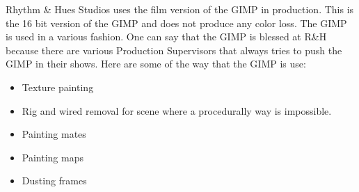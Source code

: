 Rhythm \& Hues Studios uses the film version of the GIMP in production. This is the 16 bit version of the GIMP and does not produce any color loss. The GIMP is used in a various fashion. One can say that the GIMP is blessed at R\&H because there are various Production Supervisors that always tries to push the GIMP in their shows. Here are some of the way that the GIMP is use:
\begin{itemize}
\item Texture painting 
\item Rig and wired removal for scene where a procedurally way is impossible.
\item Painting mates
\item Painting maps
\item Dusting frames
\end{itemize}


